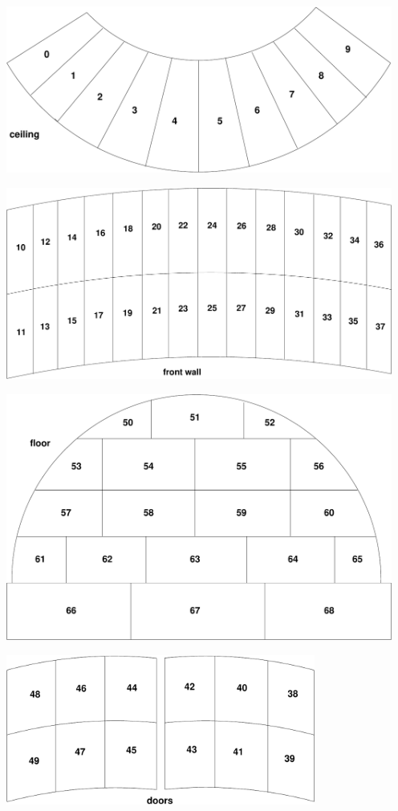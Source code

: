 \documentclass[11pt]{article}
\begin{document}
\begin{center}
\includegraphics[width=5in]{ceiling.pdf}
\end{center}

\begin{center}
\includegraphics[width=5in]{wall.pdf}
\end{center}

\begin{center}
\includegraphics[width=5in]{floor.pdf}
\end{center}

\begin{center}
\includegraphics[width=4in]{doors.pdf}
\end{center}
\end{document}
